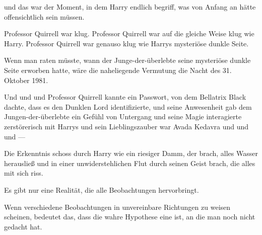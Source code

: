 und das war der Moment, in dem Harry endlich begriff, was von Anfang an hätte offensichtlich sein müssen.

\later

Professor Quirrell war klug.
Professor Quirrell war auf die gleiche Weise klug wie Harry.
Professor Quirrell war genauso klug wie Harrys mysteriöse dunkle Seite.

Wenn man raten müsste, wann der Junge-der-überlebte seine mysteriöse dunkle Seite erworben hatte, wäre die naheliegende Vermutung die Nacht des 31. Oktober 1981.

\later

Und und und Professor Quirrell kannte ein Passwort, von dem Bellatrix Black dachte, dass es den Dunklen Lord identifizierte, und seine Anwesenheit gab dem Jungen-der-überlebte ein Gefühl von Untergang und seine Magie interagierte zerstörerisch mit Harrys und sein Lieblingszauber war Avada Kedavra und und und —

Die Erkenntnis schoss durch Harry wie ein riesiger Damm, der brach, alles Wasser herausließ und in einer unwiderstehlichen Flut durch seinen Geist brach, die alles mit sich riss.

Es gibt nur eine Realität, die alle Beobachtungen hervorbringt.

Wenn verschiedene Beobachtungen in unvereinbare Richtungen zu weisen scheinen, bedeutet das, dass die wahre Hypothese eine ist, an die man noch nicht gedacht hat.

